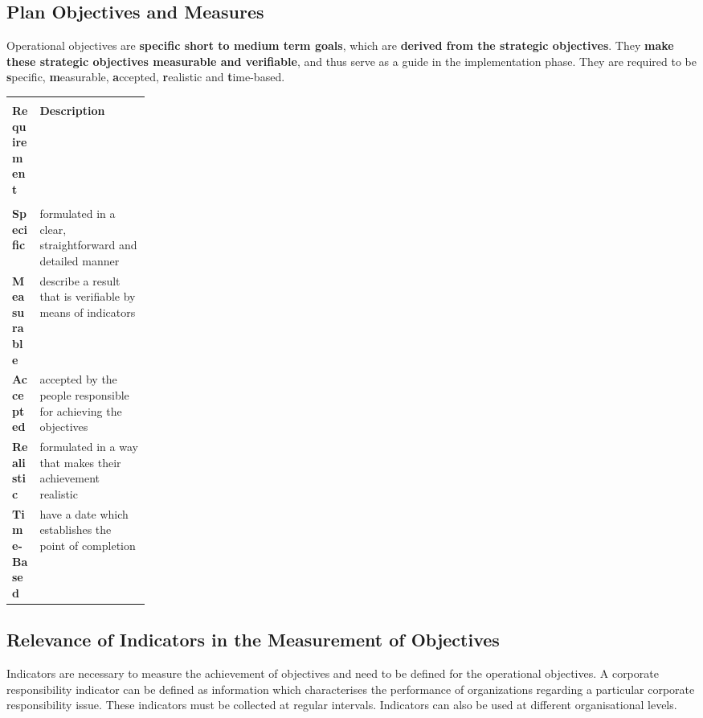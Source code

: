 \documentclass[11pt]{article}
\theoremstyle{definition}
\begin{document}
\subsection{Plan Objectives and Measures}
Operational objectives are \textbf{specific short to medium term goals}, which are \textbf{derived from the strategic objectives}. They \textbf{make these strategic objectives measurable and verifiable}, and thus serve as a guide in the implementation phase. They are required to be \textbf{s}pecific, \textbf{m}easurable, \textbf{a}ccepted, \textbf{r}ealistic and \textbf{t}ime-based.
\begin{tabularx}{\linewidth}{p{0.2\linewidth} X}
	\cellcolor{DodgerBlue1!40}& \cellcolor{DodgerBlue1!40}\\
	\cellcolor{DodgerBlue1!40} \textbf{Requirement} & \cellcolor{DodgerBlue1!40} \textbf{Description}\\
	\cellcolor{DodgerBlue1!40}& \cellcolor{DodgerBlue1!40}\\
	\textbf{Specific} & formulated in a clear, straightforward and detailed manner\\[1em]
	\textbf{Measurable} & describe a result that is verifiable by means of indicators \\[1em]
	\textbf{Accepted} & accepted by the people responsible for achieving the objectives\\[1em]
	\textbf{Realistic} & formulated in a way that makes their achievement realistic\\[1em]
	\textbf{Time-Based} & have a date which establishes the point of completion
\end{tabularx}

\subsection{Relevance of Indicators in the Measurement of Objectives}
Indicators are necessary to measure the achievement of objectives and need to be defined for the operational objectives. A corporate responsibility indicator can be defined as information which characterises the performance of organizations regarding a particular corporate responsibility issue. These indicators must be collected at regular intervals. Indicators can also be used at different organisational levels.
\end{document}

